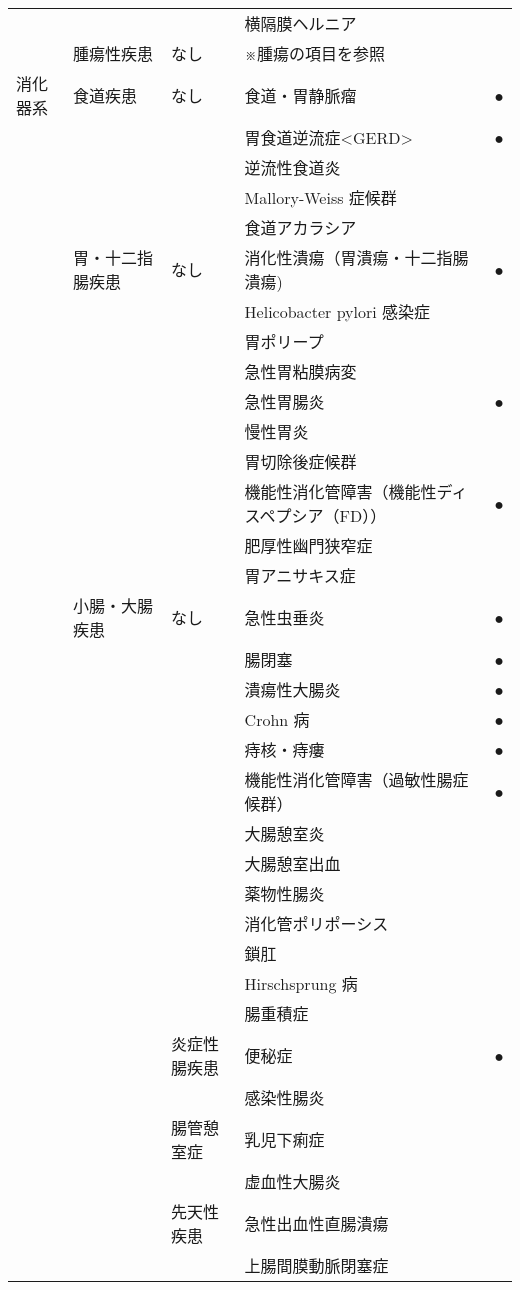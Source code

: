 \begin{xltabular}{\linewidth}{XXXXX}
 &  &  & 横隔膜ヘルニア &  \\
 & 腫瘍性疾患 & なし & ※腫瘍の項目を参照 &  \\
消化器系 & 食道疾患 & なし & 食道・胃静脈瘤 & ● \\
 &  &  & 胃食道逆流症<GERD>  & ● \\
 &  &  & 逆流性食道炎 &  \\
 &  &  & Mallory-Weiss 症候群 &  \\
 &  &  & 食道アカラシア &  \\
 & 胃・十二指腸疾患 & なし & 消化性潰瘍（胃潰瘍・十二指腸潰瘍) & ● \\
 &  &  & Helicobacter pylori 感染症 &  \\
 &  &  & 胃ポリープ &  \\
 &  &  & 急性胃粘膜病変 &  \\
 &  &  & 急性胃腸炎 & ● \\
 &  &  & 慢性胃炎 &  \\
 &  &  & 胃切除後症候群 &  \\
 &  &  & 機能性消化管障害（機能性ディスペプシア（FD）） & ● \\
 &  &  & 肥厚性幽門狭窄症 &  \\
 &  &  & 胃アニサキス症 &  \\
 & 小腸・大腸疾患 & なし & 急性虫垂炎 & ● \\
 &  &  & 腸閉塞 & ● \\
 &  &  & 潰瘍性大腸炎 & ● \\
 &  &  & Crohn 病 & ● \\
 &  &  & 痔核・痔瘻 & ● \\
 &  &  & 機能性消化管障害（過敏性腸症候群） & ● \\
 &  &  & 大腸憩室炎 &  \\
 &  &  & 大腸憩室出血 &  \\
 &  &  & 薬物性腸炎 &  \\
 &  &  & 消化管ポリポーシス &  \\
 &  &  & 鎖肛 &  \\
 &  &  & Hirschsprung 病 &  \\
 &  &  & 腸重積症 &  \\
 &  & 炎症性腸疾患 & 便秘症 & ● \\
 &  &  & 感染性腸炎 &  \\
 &  & 腸管憩室症 & 乳児下痢症 &  \\
 &  &  & 虚血性大腸炎 &  \\
 &  & 先天性疾患 & 急性出血性直腸潰瘍 &  \\
 &  &  & 上腸間膜動脈閉塞症 &  \\

\end{xltabular}
